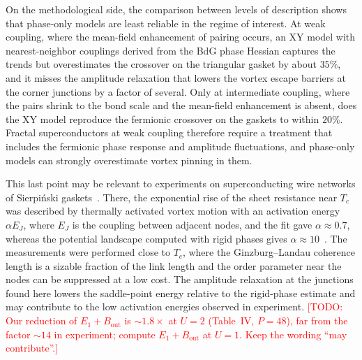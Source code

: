 \documentclass[aps,prb,twocolumn,superscriptaddress,floatfix]{revtex4-2}
\newcommand{\todo}[1]{\textcolor{red}{[TODO: #1]}}
\begin{document}
On the methodological side, the comparison between levels of description
shows that phase-only models are least reliable in the regime of interest.
At weak coupling, where the mean-field enhancement of pairing occurs, an XY
model with nearest-neighbor couplings derived from the BdG phase Hessian
captures the trends but overestimates the crossover on the triangular gasket
by about $35\%$, and it misses the amplitude relaxation that lowers the
vortex escape barriers at the corner junctions by a factor of several. Only
at intermediate coupling, where the pairs shrink to the bond scale and the
mean-field enhancement is absent, does the XY model reproduce the fermionic
crossover on the gaskets to within $20\%$. Fractal superconductors at weak
coupling therefore require a treatment that includes the fermionic phase
response and amplitude fluctuations, and phase-only models can strongly
overestimate vortex pinning in them.

This last point may be relevant to experiments on superconducting wire
networks of Sierpi\'nski gaskets~\cite{Meyer1991,Meyer1992}. There, the
exponential rise of the sheet resistance near $T_c$ was described by thermally
activated vortex motion with an activation energy $\alpha E_J$, where $E_J$ is
the coupling between adjacent nodes, and the fit gave $\alpha \approx 0.7$,
whereas the potential landscape computed with rigid phases gives
$\alpha \approx 10$~\cite{Meyer1992}. The measurements were performed close to
$T_c$, where the Ginzburg--Landau coherence length is a sizable fraction of
the link length and the order parameter near the nodes can be suppressed at a
low cost. The amplitude relaxation at the junctions found here lowers the
saddle-point energy relative to the rigid-phase estimate and may contribute to
the low activation energies observed in experiment.
\todo{Our reduction of $E_1 + B_{\mathrm{out}}$ is $\sim 1.8\times$ at $U=2$
(Table~IV, $P=48$), far from the factor $\sim 14$ in experiment; compute
$E_1+B_{\mathrm{out}}$ at $U=1$. Keep the wording ``may contribute''.}
\end{document}
